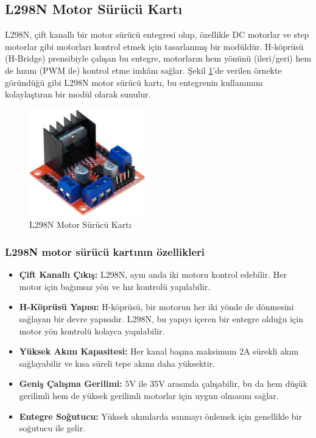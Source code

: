\subsection{L298N Motor Sürücü Kartı}
    L298N, çift kanallı bir motor sürücü entegresi olup, özellikle DC motorlar ve step motorlar gibi motorları kontrol etmek için tasarlanmış bir modüldür. H-köprüsü (H-Bridge) prensibiyle çalışan bu entegre, motorların hem yönünü (ileri/geri) hem de hızını (PWM ile) kontrol etme imkânı sağlar. Şekil \ref{fig:12}'de verilen örnekte göründüğü gibi L298N motor sürücü kartı, bu entegrenin kullanımını kolaylaştıran bir modül olarak sunulur.

\begin{figure}[H]
\centering
\includegraphics[width=0.45\textwidth]{Resimler/12.png}
\caption{L298N Motor Sürücü Kartı}
\label{fig:12}
\end{figure}

\subsubsection{L298N motor sürücü kartının özellikleri}
\begin{itemize}   
\item \textbf{Çift Kanallı Çıkış:} L298N, aynı anda iki motoru kontrol edebilir. Her motor için bağımsız yön ve hız kontrolü yapılabilir.
\item \textbf{H-Köprüsü Yapısı:} H-köprüsü, bir motorun her iki yönde de dönmesini sağlayan bir devre yapısıdır. L298N, bu yapıyı içeren bir entegre olduğu için motor yön kontrolü kolayca yapılabilir.
\item \textbf{Yüksek Akım Kapasitesi:} Her kanal başına maksimum 2A sürekli akım sağlayabilir ve kısa süreli tepe akımı daha yüksektir.
\item \textbf{Geniş Çalışma Gerilimi:} 5V ile 35V arasında çalışabilir, bu da hem düşük gerilimli hem de yüksek gerilimli motorlar için uygun olmasını sağlar.
\item \textbf{Entegre Soğutucu:} Yüksek akımlarda ısınmayı önlemek için genellikle bir soğutucu ile gelir.
\end{itemize}

